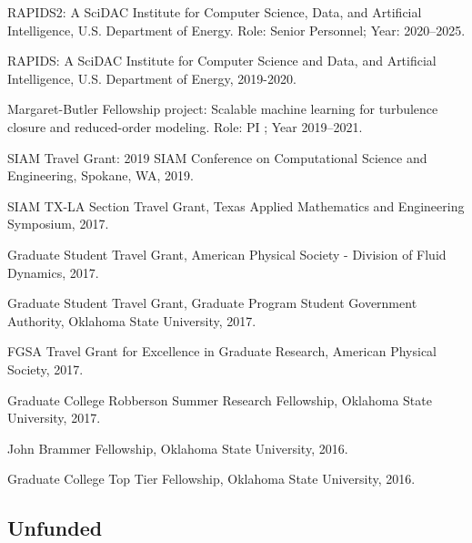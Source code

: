 \documentclass[letterpaper]{article}
\renewenvironment{itemize}{
  \begin{list}{}{
    \setlength{\leftmargin}{1.5em}
  }
}{
  \end{list}
}
\begin{document}
\begin{itemize}

  \item RAPIDS2: A SciDAC Institute for Computer Science, Data, and Artificial Intelligence, U.S. Department of Energy. Role: Senior Personnel; Year: 2020--2025.

  \item RAPIDS: A SciDAC Institute for Computer Science and Data, and Artificial Intelligence, U.S. Department of Energy, 2019-2020.

  \item Margaret-Butler Fellowship project: Scalable machine learning for turbulence closure and reduced-order modeling. Role: PI ; Year 2019--2021.

  \item SIAM Travel Grant: 2019 SIAM Conference on Computational Science and Engineering, Spokane, WA, 2019.

  \item SIAM TX-LA Section Travel Grant, Texas Applied Mathematics and Engineering Symposium, 2017.

  \item Graduate Student Travel Grant, American Physical Society - Division of Fluid Dynamics, 2017.

  \item Graduate Student Travel Grant, Graduate Program Student Government Authority, Oklahoma State University, 2017.

  \item FGSA Travel Grant for Excellence in Graduate Research, American Physical Society, 2017.

  \item Graduate College Robberson Summer Research Fellowship, Oklahoma State University, 2017.

  \item John Brammer Fellowship, Oklahoma State University, 2016.

  \item Graduate College Top Tier Fellowship, Oklahoma State University, 2016.
\end{itemize}

\subsection*{Unfunded}
\end{document}
